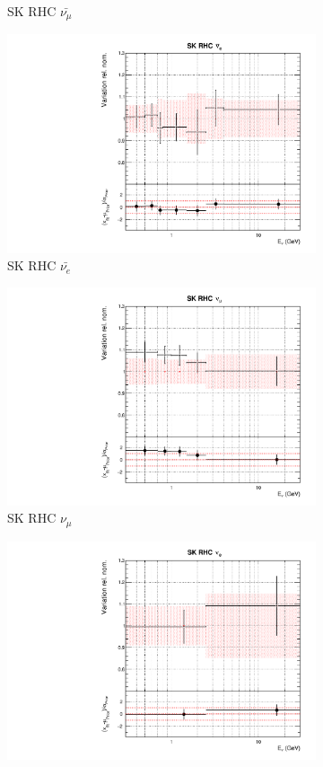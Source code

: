 \begin{figure}
\begin{subfigure}{0.24\textwidth}
  \caption{SK RHC $\bar{\nu_{\mu}}$}
  \label{fig:}
\end{subfigure}
\begin{subfigure}{0.24\textwidth}
  \centering
  \includegraphics[width=0.95\linewidth]{figs/datflux13}
  \caption{SK RHC $\bar{\nu_e}$}
  \label{fig:}
\end{subfigure}
\begin{subfigure}{0.24\textwidth}
  \centering
  \includegraphics[width=0.95\linewidth]{figs/datflux14}
  \caption{SK RHC $\nu_{\mu}$}
  \label{fig:}
\end{subfigure}
\begin{subfigure}{0.24\textwidth}
  \centering
  \includegraphics[width=0.95\linewidth]{figs/datflux15}

\end{subfigure}
\end{figure}
